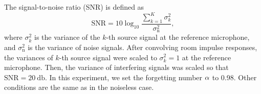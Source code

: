\documentclass[sip,biber]{now-journal}
\begin{document}
The signal-to-noise ratio (SNR) is defined as
\begin{equation}
  \text{SNR} = 10 \log _{10} \frac{\sum _{k=1} ^{K} \sigma _{k} ^{2}}{\sigma _{\mathrm{n}} ^{2}},
\end{equation}
where
$\sigma _{k} ^{2}$ is the variance of the $k$-th source signal at the reference microphone,
and $\sigma _{\mathrm{n}} ^{2}$ is the variance of noise signals.
After convolving room impulse responses, the variances of $k$-th source signal were scaled to $\sigma _{k} ^{2} = 1$ at the reference microphone.
Then, the variance of interfering signals was scaled so that $\text{SNR} = \SI{20}{\decibel}$.
In this experiment, we set the forgetting number $\alpha$ to 0.98.
Other conditions are the same as in the noiseless case.
\end{document}
